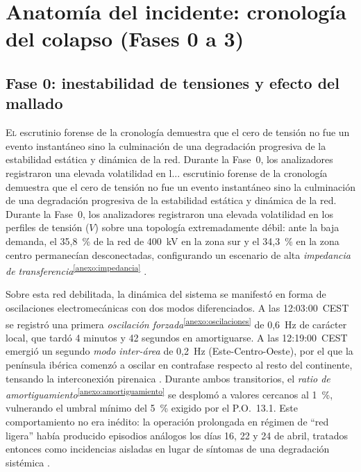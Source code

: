 \chapter{Anatomía del incidente: cronología del colapso (Fases 0 a 3)}
\label{cap:analisis_incidente}

\section{Fase 0: inestabilidad de tensiones y efecto del mallado}
\label{sec:fase_0_inestabilidad}

\lettrine[lines=3, lhang=0.1]{E}{l} escrutinio forense de la cronología demuestra que el cero de tensión no fue un evento instantáneo sino la culminación de una degradación progresiva de la estabilidad estática y dinámica de la red. Durante la Fase~0, los analizadores registraron una elevada volatilidad en l... escrutinio forense de la cronología demuestra que el cero de tensión no fue
un evento instantáneo sino la culminación de una degradación progresiva de la
estabilidad estática y dinámica de la red. Durante la Fase~0, los analizadores
registraron una elevada volatilidad en los perfiles de tensión ($V$) sobre una
topología extremadamente débil: ante la baja demanda, el 35,8~\% de la red de
400~kV en la zona sur y el 34,3~\% en la zona centro permanecían
desconectadas, configurando un escenario de alta \textit{impedancia de
transferencia}\textsuperscript{\ref{anexo:impedancia}} \cite{icai2025}.

Sobre esta red debilitada, la dinámica del sistema se manifestó en forma de
oscilaciones electromecánicas con dos modos diferenciados. A las
12:03:00~CEST se registró una primera \textit{oscilación forzada}\textsuperscript{\ref{anexo:oscilaciones}} de
0,6~Hz de carácter local,
que tardó 4 minutos y 42 segundos en amortiguarse. A las 12:19:00~CEST
emergió un segundo \textit{modo inter-área} de 0,2~Hz (Este-Centro-Oeste),
por el que la península ibérica comenzó a oscilar en contrafase respecto al
resto del continente, tensando la interconexión pirenaica \cite{entsoe2025}.
Durante ambos transitorios, el \textit{ratio de amortiguamiento}\textsuperscript{\ref{anexo:amortiguamiento}} se desplomó a valores
cercanos al 1~\%, vulnerando el umbral mínimo del 5~\% exigido por el
P.O.~13.1. Este comportamiento no era inédito: la operación prolongada en
régimen de ``red ligera'' había producido episodios análogos los días 16,
22 y 24 de abril, tratados entonces como incidencias aisladas en lugar de
síntomas de una degradación sistémica \cite{icai2025}.

